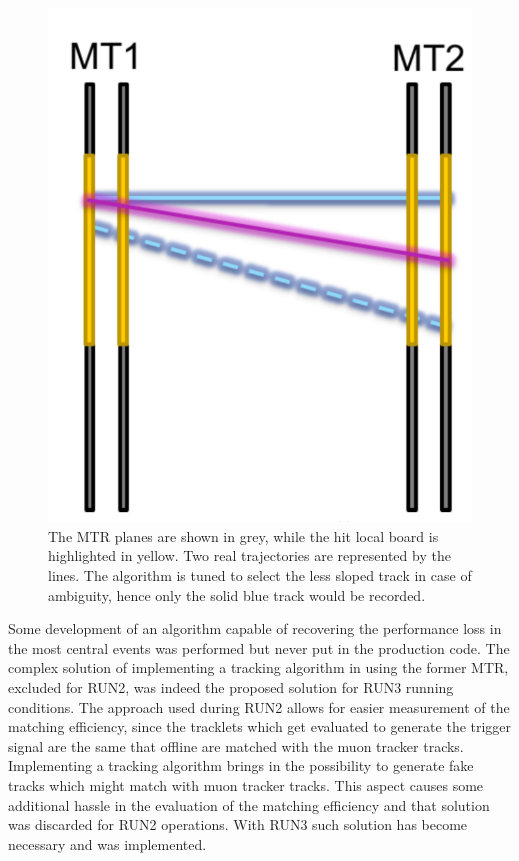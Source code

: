 \begin{figure}[!ht]
\begin{center}
\includegraphics[width=0.5\linewidth]{Chapters/O2/Figs/MTR_old.pdf}
\caption{The MTR planes are shown in grey, while the hit local board is highlighted in yellow. Two real trajectories are represented by the lines. The algorithm is tuned to select the less sloped track in case of ambiguity, hence only the solid blue track would be recorded.}
\label{fig:MTR_loss}
\end{center}
\end{figure}

Some development of an algorithm capable of recovering the performance loss in the most central events was performed but never put in the production code.
The complex solution of implementing a tracking algorithm in using the former MTR, excluded for RUN2, was indeed the proposed solution for RUN3 running conditions.
The approach used during RUN2 allows for easier measurement of the matching efficiency, since the tracklets which get evaluated to generate the trigger signal are the same that offline are matched with the muon tracker tracks.
Implementing a tracking algorithm brings in the possibility to generate fake tracks which might match with muon tracker tracks.
This aspect causes some additional hassle in the evaluation of the matching efficiency and that solution was discarded for RUN2 operations.
With RUN3 such solution has become necessary and was implemented.


